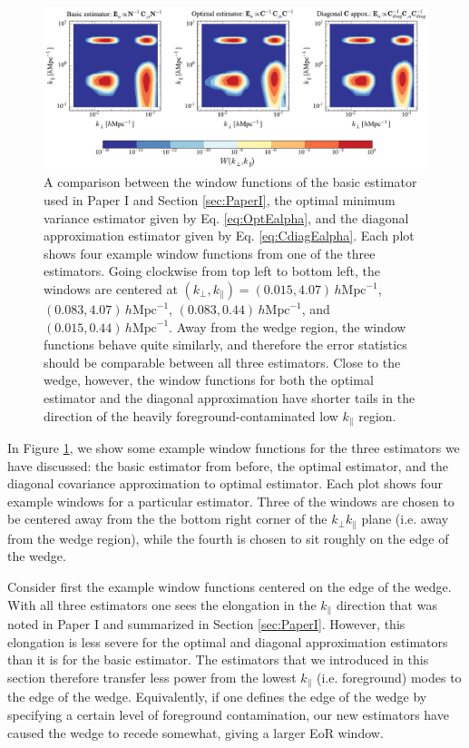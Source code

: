 \documentclass[twocolumn,aps,prd,nofootinbib,showpacs]{revtex4-1}
\begin{document}
\begin{figure}[!ht] 
	\centering 
	\includegraphics[width=1\textwidth]{figures/comparisonWindCollection.pdf}
	\caption{A comparison between the window functions of the basic estimator used in Paper I and Section \ref{sec:PaperI}, the optimal minimum variance estimator given by Eq. \eqref{eq:OptEalpha}, and the diagonal approximation estimator given by Eq. \eqref{eq:CdiagEalpha}.  Each plot shows four example window functions from one of the three estimators.  Going clockwise from top left to bottom left, the windows are centered at $(k_\perp, k_\parallel) = (0.015, 4.07)\,h\textrm{Mpc}^{-1}$, $(0.083, 4.07)\,h\textrm{Mpc}^{-1}$, $(0.083, 0.44)\,h\textrm{Mpc}^{-1}$, and $(0.015, 0.44)\,h\textrm{Mpc}^{-1}$.  Away from the wedge region, the window functions behave quite similarly, and therefore the error statistics should be comparable between all three estimators.  Close to the wedge, however, the window functions for both the optimal estimator and the diagonal approximation have shorter tails in the direction of the heavily foreground-contaminated low $k_\parallel$ region.}
	\label{fig:comparisonWindCollection}
\end{figure} 

In Figure \ref{fig:comparisonWindCollection}, we show some example window functions for the three estimators we have discussed: the basic estimator from before, the optimal estimator, and the diagonal covariance approximation to optimal estimator.  Each plot shows four example windows for a particular estimator.  Three of the windows are chosen to be centered away from the the bottom right corner of the $k_\perp k_\parallel$ plane (i.e. away from the wedge region), while the fourth is chosen to sit roughly on the edge of the wedge.  

Consider first the example window functions centered on the edge of the wedge.  With all three estimators one sees the elongation in the $k_\parallel$ direction that was noted in Paper I and summarized in Section \ref{sec:PaperI}.  However, this elongation is less severe for the optimal and diagonal approximation estimators than it is for the basic estimator.  The estimators that we introduced in this section therefore transfer less power from the lowest $k_\parallel$ (i.e. foreground) modes to the edge of the wedge.  Equivalently, if one defines the edge of the wedge by specifying a certain level of foreground contamination, our new estimators have caused the wedge to recede somewhat, giving a larger EoR window.
\end{document}
